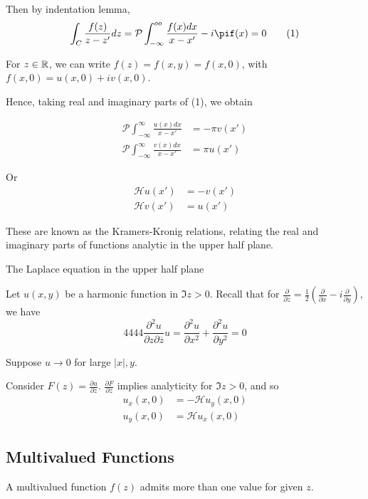 \documentclass[a4paper]{article}
\begin{document}
Then by indentation lemma, \[
	\int_{C} \frac{f(z)}{z-z'} dz = \mathcal{P} \int_{-\infty}^{oo} \frac{f(x) dx}{x-x'} - i\pif(x) = 0 \tag{1}
\]

For $z \in \mathbb{R}$, we can write $f(z) = f(x,y) = f(x,0)$, with $f(x,0) = u(x,0) + iv(x,0)$.

Hence, taking real and imaginary parts of (1), we obtain

\begin{align*}
	\mathcal{P} \int_{-\infty}^{\infty} \frac{u(x) dx}{x-x'} &= -\pi v(x') \\
	\mathcal{P} \int_{-\infty}^{\infty} \frac{v(x)dx}{x-x'} &= \pi u(x')
\end{align*}

Or
\begin{align*}
	\mathcal{H} u(x') &= -v(x') \\
	\mathcal{H} v(x') &= u(x')
\end{align*}

These are known as the Kramers-Kronig relations, relating the real and imaginary parts of functions analytic in the upper half plane.

\begin{eg} The Laplace equation in the upper half plane

	Let $u(x,y)$ be a harmonic function in $\Im z>0$. Recall that for $\frac{\partial }{\partial z}  = \frac{1}{2} \left( \frac{\partial }{\partial x} - i \frac{\partial }{\partial y}  \right)$, we have
	\[
	4 4 4 4 \frac{\partial ^2 u}{\partial z \partial \overline{z}}u = \frac{\partial^2 u}{\partial x^2} + \frac{\partial^2u }{\partial y^2}  = 0
	\]

	Suppose $u\to 0$ for large $|x|, y$.

	Consider  $F(z) = \frac{\partial u}{\partial z} $. $\frac{\partial F}{\partial \overline{z}} $ implies analyticity for $\Im z > 0$, and so
	\begin{align*}
		u_x (x,0) &= -\mathcal{H} u_y (x,0) \\
		u_y (x,0) &= \mathcal{H} u_x (x,0)
	\end{align*}
	 
\end{eg}

\subsection{Multivalued Functions}

\begin{defn}
	A multivalued function $f(z)$ admits more than one value for given $z$.
\end{defn}
\end{document}
